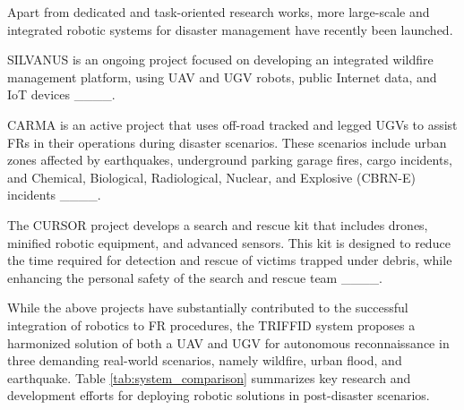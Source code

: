 Apart from dedicated and task-oriented research works, more large-scale and integrated robotic systems for disaster management have recently been launched.

SILVANUS is an ongoing project focused on developing an integrated wildfire management platform, using UAV and UGV robots, public Internet data, and IoT devices ____.

CARMA is an active project that uses off-road tracked and legged UGVs to assist FRs in their operations during disaster scenarios. These scenarios include urban zones affected by earthquakes, underground parking garage fires, cargo incidents, and Chemical, Biological, Radiological, Nuclear, and Explosive (CBRN-E) incidents ____.

The CURSOR project develops a search and rescue kit that includes drones, minified robotic equipment, and advanced sensors. This kit is designed to reduce the time required for detection and rescue of victims trapped under debris, while enhancing the personal safety of the search and rescue team ____.

While the above projects have substantially contributed to the successful integration of robotics to FR procedures, the TRIFFID system proposes a harmonized solution of both a UAV and UGV for autonomous reconnaissance in three demanding real-world scenarios, namely wildfire, urban flood, and earthquake. Table \ref{tab:system_comparison} summarizes key research and development efforts for deploying robotic solutions in post-disaster scenarios.